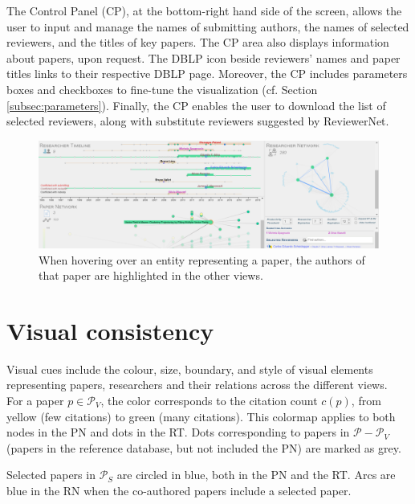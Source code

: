 The Control Panel (CP), at the bottom-right hand side of the screen, allows the user to input and manage the names of submitting authors, the names of selected reviewers, and the titles of key papers. The CP area also displays information about papers, upon request. The DBLP icon beside reviewers' names and paper titles links to their respective DBLP page. Moreover, the CP includes parameters boxes and checkboxes to fine-tune the visualization (cf. Section \ref{subsec:parameters}). Finally, the CP enables the user to download the list of selected reviewers, along with substitute reviewers suggested by ReviewerNet.  

\begin{figure}[!pt]
\centering
\includegraphics[width=\textwidth]{images/paperhovering_crop.png}
\caption{When hovering over an entity representing a paper, the authors of that paper are highlighted in the other views.}
\label{fig:paperhovering}
\end{figure}


\section{Visual consistency}
\label{subsec:visualvar}

Visual cues include the colour, size, boundary, and style of visual elements representing papers, researchers and their relations across the different views.  \\

For a paper $p \in \mathcal{P}_{V}$, the color corresponds to the citation count $c(p)$, from yellow (few citations) to green (many citations). This colormap applies to both nodes in the PN and dots in the RT. Dots corresponding to papers in $\mathcal{P} - \mathcal{P}_V$ (papers in the reference database, but not included the PN) are marked as grey. 

Selected papers in $\mathcal{P}_S$ are circled in blue, both in the PN and the RT.  Arcs are blue in the RN when the co-authored papers include a selected paper.  \\


